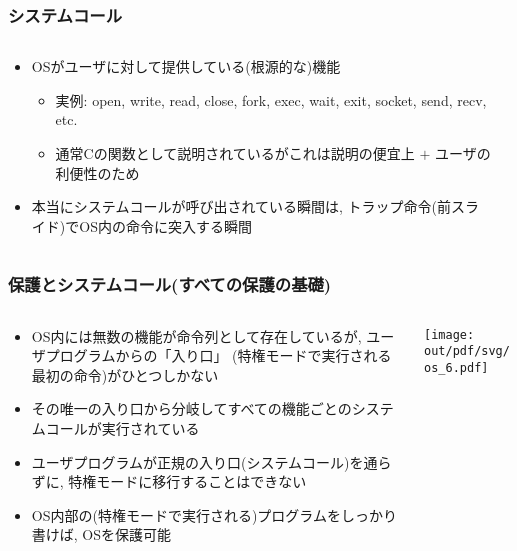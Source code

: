 \documentclass[12pt,dvipdfmx]{beamer}
\begin{document}
\begin{frame}
\frametitle{システムコール}
\begin{columns}
  \begin{column}{0.6\textwidth}
    \begin{itemize}
    \item OSがユーザに対して提供している(根源的な)機能
      \begin{itemize}
      \item 実例:
        open, write, read, close, fork, exec, wait, exit, socket, send, recv, etc.
      \item 通常Cの関数として説明されているがこれは説明の便宜上 $+$ ユーザの利便性のため
      \end{itemize}
    \item 本当にシステムコールが呼び出されている瞬間は,
      トラップ命令(前スライド)でOS内の命令に突入する瞬間
    \end{itemize}
  \end{column}
  \begin{column}{0.4\textwidth}
  \end{column}
\end{columns}
\end{frame}

\begin{frame}
\frametitle{保護とシステムコール(すべての保護の基礎)}
\begin{columns}
  \begin{column}{0.6\textwidth}
    \begin{itemize}
    \item OS内には無数の機能が命令列として存在しているが,
      ユーザプログラムからの「入り口」
      (特権モードで実行される最初の命令)がひとつしかない
      
    \item その唯一の入り口から分岐してすべての機能ごとのシステムコールが実行されている
      
    \item ユーザプログラムが正規の入り口(システムコール)を通らずに,
      特権モードに移行することはできない
      
    \item OS内部の(特権モードで実行される)プログラムをしっかり書けば,
      OSを保護可能
    \end{itemize}
  \end{column}
  \begin{column}{0.4\textwidth}
    \texttt{[image: out/pdf/svg/os\_6.pdf]}
  \end{column}
\end{columns}
\end{frame}
\end{document}
